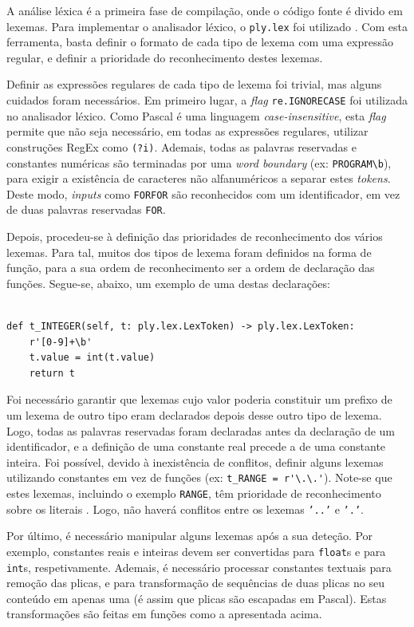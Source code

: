 \documentclass[12pt, a4paper]{article}
\begin{document}
A análise léxica é a primeira fase de compilação, onde o código fonte é divido em lexemas. Para
implementar o analisador léxico, o \texttt{ply.lex} foi utilizado \cite{ply}. Com esta ferramenta,
basta definir o formato de cada tipo de lexema com uma expressão regular, e definir a prioridade do
reconhecimento destes lexemas.

Definir as expressões regulares de cada tipo de lexema foi trivial, mas alguns cuidados foram
necessários. Em primeiro lugar, a \emph{flag} \texttt{re.IGNORECASE} foi utilizada no analisador
léxico. Como Pascal é uma linguagem \emph{case-insensitive}, esta \emph{flag} permite que não seja
necessário, em todas as expressões regulares, utilizar construções RegEx como \texttt{(?i)}.
Ademais, todas as palavras reservadas e constantes numéricas são terminadas por uma
\emph{word boundary} (ex: \verb|PROGRAM\b|), para exigir a existência de caracteres não
alfanuméricos a separar estes \emph{tokens}. Deste modo, \emph{inputs} como \texttt{FORFOR} são
reconhecidos com um identificador, em vez de duas palavras reservadas \texttt{FOR}.

Depois, procedeu-se à definição das prioridades de reconhecimento dos vários lexemas. Para tal,
muitos dos tipos de lexema foram definidos na forma de função, para a sua ordem de reconhecimento
ser a ordem de declaração das funções. Segue-se, abaixo, um exemplo de uma destas declarações:

\lstset{
    language=python
}

\begin{lstlisting}

def t_INTEGER(self, t: ply.lex.LexToken) -> ply.lex.LexToken:
    r'[0-9]+\b'
    t.value = int(t.value)
    return t
\end{lstlisting}

Foi necessário garantir que lexemas cujo valor poderia constituir um prefixo de um lexema de outro
tipo eram declarados depois desse outro tipo de lexema. Logo, todas as palavras reservadas foram
declaradas antes da declaração de um identificador, e a definição de uma constante real precede a de
uma constante inteira. Foi possível, devido à inexistência de conflitos, definir alguns lexemas
utilizando constantes em vez de funções (ex: \verb|t_RANGE = r'\.\.'|). Note-se que estes lexemas,
incluindo o exemplo \texttt{RANGE}, têm prioridade de reconhecimento sobre os literais \cite{ply}.
Logo, não haverá conflitos entre os lexemas \texttt{'..'} e \texttt{'.'}.

Por último, é necessário manipular alguns lexemas após a sua deteção. Por exemplo, constantes reais
e inteiras devem ser convertidas para \texttt{float}s e para \texttt{int}s, respetivamente. Ademais,
é necessário processar constantes textuais para remoção das plicas, e para transformação de
sequências de duas plicas no seu conteúdo em apenas uma (é assim que plicas são escapadas em
Pascal). Estas transformações são feitas em funções como a apresentada acima.
\end{document}
